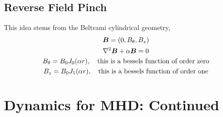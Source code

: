 \documentclass{article}
\begin{document}
\subsection{Reverse Field Pinch}
This idea stems from the Beltrami cylindrical geometry, 
\begin{gather*}
    \boldsymbol{B} = \left(0, B_{\theta}, B_z\right)\\
    \nabla^2\boldsymbol{B} + \alpha\boldsymbol{B} = 0\\
    B_{\theta} = B_0J_0(\alpha r), \quad \text{this is a bessels function of
    order zero}\\
    B_{z} = B_0J_1(\alpha r), \quad \text{this is a bessels function of
    order one}
\end{gather*}


\section{Dynamics for MHD: Continued}
\end{document}
